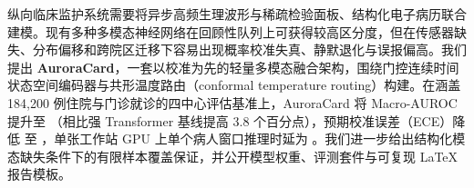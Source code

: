 纵向临床监护系统需要将异步高频生理波形与稀疏检验面板、结构化电子病历联合建模。现有多种多模态神经网络在回顾性队列上可获得较高区分度，但在传感器缺失、分布偏移和跨院区迁移下容易出现概率校准失真、静默退化与误报偏高。我们提出 \textbf{AuroraCard}，一套以校准为先的轻量多模态融合架构，围绕门控连续时间状态空间编码器与共形温度路由（conformal temperature routing）构建。在涵盖 184{,}200 例住院与门诊就诊的四中心评估基准上，AuroraCard 将 Macro-AUROC 提升至 （相比强 Transformer 基线提高 3.8 个百分点），预期校准误差（ECE）降低  至 ，单张工作站 GPU 上单个病人窗口推理时延为 。我们进一步给出结构化模态缺失条件下的有限样本覆盖保证，并公开模型权重、评测套件与可复现 LaTeX 报告模板。
